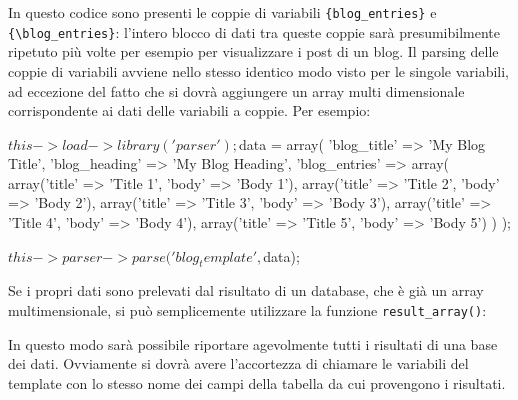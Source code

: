 In questo codice sono presenti le coppie di variabili \verb|{blog_entries}| e \verb|{\blog_entries}|: l'intero blocco di dati tra queste coppie sarà presumibilmente ripetuto più volte per esempio per visualizzare i post di un blog. Il parsing delle coppie di variabili avviene nello stesso identico modo visto per le singole variabili, ad eccezione del fatto che si dovrà aggiungere un array multi dimensionale corrispondente ai dati delle variabili a coppie. Per esempio:

\begin{code}
$this->load->library('parser');

$data = array(
'blog_title'   => 'My Blog Title',
'blog_heading' => 'My Blog Heading',
'blog_entries' => array(
				array('title' => 'Title 1', 'body' => 'Body 1'),
				array('title' => 'Title 2', 'body' => 'Body 2'),
				array('title' => 'Title 3', 'body' => 'Body 3'),
				array('title' => 'Title 4', 'body' => 'Body 4'),
				array('title' => 'Title 5', 'body' => 'Body 5')
						)
			);

$this->parser->parse('blog_template', $data);
\end{code}

Se i propri dati sono prelevati dal risultato di un database, che è già un array multimensionale, si può semplicemente utilizzare la funzione \verb|result_array()|:


In questo modo sarà possibile riportare agevolmente tutti i risultati di una base dei dati. Ovviamente si dovrà avere l'accortezza di chiamare le variabili del template con lo stesso nome dei campi della tabella da cui provengono i risultati.